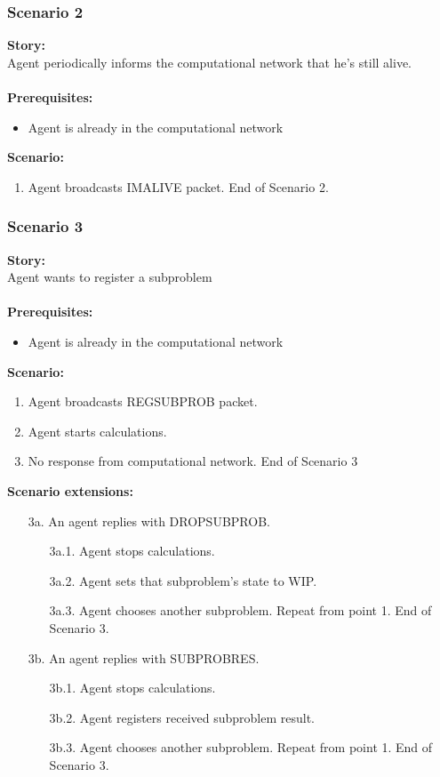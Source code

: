 \documentclass{article}
\begin{document}
\subsubsection{Scenario 2}
\noindent\textbf{Story:} \\
Agent periodically informs the computational network that he's still alive. \\\\
\textbf{Prerequisites:}
\begin{itemize}
    \item Agent is already in the computational network
\end{itemize}
\textbf{Scenario:}
\begin{enumerate}
    \item Agent broadcasts IMALIVE packet. End of Scenario 2.
\end{enumerate}

\subsubsection{Scenario 3}
\noindent\textbf{Story:} \\
Agent wants to register a subproblem \\\\
\textbf{Prerequisites:}
\begin{itemize}
    \item Agent is already in the computational network
\end{itemize}
\textbf{Scenario:}
\begin{enumerate}
    \item Agent broadcasts REGSUBPROB packet.
    \item Agent starts calculations.
    \item No response from computational network. End of Scenario 3
\end{enumerate}
\textbf{Scenario extensions:}
\begin{itemize}
    \item[3a.] An agent replies with DROPSUBPROB.
    \begin{itemize} 
    \item[3a.1.] Agent stops calculations.
    \item[3a.2.] Agent sets that subproblem's state to WIP.
    \item[3a.3.] Agent chooses another subproblem. Repeat from point 1. End of Scenario 3.  
    \end{itemize}
    \item[3b.] An agent replies with SUBPROBRES. 
    \begin{itemize} 
    \item[3b.1.] Agent stops calculations.
    \item[3b.2.] Agent registers received subproblem result. 
    \item[3b.3.] Agent chooses another subproblem. Repeat from point 1. End of Scenario 3.  
    \end{itemize}
\end{itemize}
\end{document}
